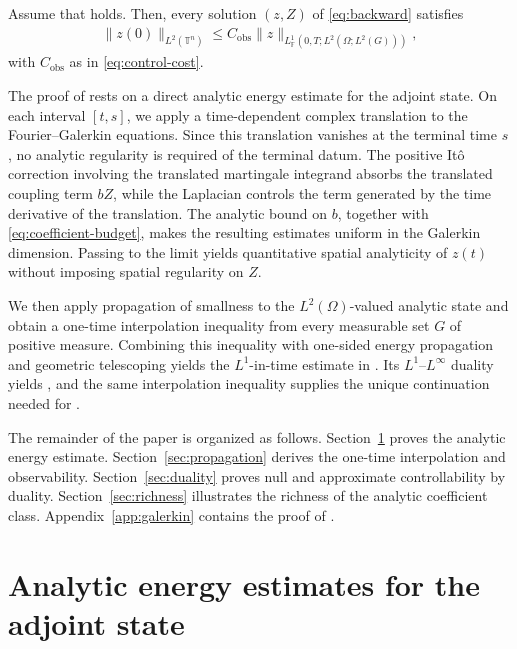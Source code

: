 \documentclass[print,wide]{draft}
\begin{document}
\begin{theorem}
\label{thm:state-observability}
Assume that  holds. 
Then, every solution
$(z,Z)$ of \eqref{eq:backward} satisfies
\begin{align}\label{eq:state-observability}
\lVert z(0)\rVert_{L^2(\mathbb{T}^n)}
\leq C_{\mathrm{obs}}
\lVert z\rVert_{L^1_{\mathbb F}(0,T;L^2(\Omega;L^2(G)))},
\end{align}
with $C_{\mathrm{obs}}$ as in \eqref{eq:control-cost}.
\end{theorem}
%
The proof of  rests on a direct analytic energy estimate for the adjoint state. On each interval \([t,s]\), we apply a time-dependent complex translation to the Fourier--Galerkin equations. Since this translation vanishes at the terminal time \(s\), no analytic regularity is required of the terminal datum. The positive It\^o correction involving the translated martingale integrand absorbs the translated coupling term \(bZ\), while the Laplacian controls the term generated by the time derivative of the translation. The analytic bound on \(b\), together with \eqref{eq:coefficient-budget}, makes the resulting estimates uniform in the Galerkin dimension. Passing to the limit yields quantitative spatial analyticity of \(z(t)\) without imposing spatial regularity on \(Z\).

We then apply propagation of smallness to the \(L^2(\Omega)\)-valued analytic state and obtain a one-time interpolation inequality from every measurable set \(G\) of positive measure. Combining this inequality with one-sided energy propagation and geometric telescoping yields the \(L^1\)-in-time estimate in . Its \(L^1\)--\(L^\infty\) duality yields , and the same interpolation inequality supplies the unique continuation needed for .

The remainder of the paper is organized as follows. Section~\ref{sec:analytic-smoothing} proves the analytic energy estimate. Section~\ref{sec:propagation} derives the one-time interpolation and observability. Section~\ref{sec:duality} proves null and approximate controllability by duality. Section~\ref{sec:richness} illustrates the richness of the analytic coefficient class. Appendix~\ref{app:galerkin} contains the proof of .

\section{Analytic energy estimates for the adjoint state}\label{sec:analytic-smoothing}
\end{document}
